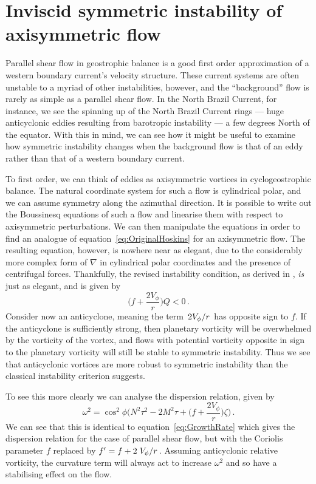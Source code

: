 \section{Inviscid symmetric instability of axisymmetric flow}
\label{sec:InviscidCentrifugal}
Parallel shear flow in geostrophic balance is a good first order approximation of a western boundary current's velocity structure. These current systems are often unstable to a myriad of other instabilities, however, and the ``background'' flow is rarely as simple as a parallel shear flow. In the North Brazil Current, for instance, we see the spinning up of the North Brazil Current rings --- huge anticyclonic eddies resulting from barotropic instability --- a few degrees North of the equator. With this in mind, we can see how it might be useful to examine how symmetric instability changes when the background flow is that of an eddy rather than that of a western boundary current.

To first order, we can think of eddies as axisymmetric vortices in cyclogeostrophic balance. The natural coordinate system for such a flow is cylindrical polar, and we can assume symmetry along the azimuthal direction. It is possible to write out the Boussinesq equations of such a flow and linearise them with respect to axisymmetric perturbations. We can then manipulate the equations in order to find an analogue of equation~\ref{eq:OriginalHoskins} for an axisymmetric flow. The resulting equation, however, is nowhere near as elegant, due to the considerably more complex form of $\nabla$ in cylindrical polar coordinates and the presence of centrifugal forces\footnotemark. Thankfully, the revised instability condition, as derived in \citet{Buckingham2021}, \textit{is} just as elegant, and is given by
\begin{equation}
    \bigg(f + \frac{2 V_\phi}{r}\bigg)Q < 0 \, .
\end{equation}
Consider now an anticyclone, meaning the term $\flatfrac{2V_\phi}{r}$ has opposite sign to $f$. If the anticyclone is sufficiently strong, then planetary vorticity will be overwhelmed by the vorticity of the vortex, and flows with potential vorticity  opposite in sign to the planetary vorticity will still be stable to symmetric instability. Thus we see that anticyclonic vortices are more robust to symmetric instability than the classical instability criterion suggests.

To see this more clearly we can analyse the dispersion relation, given by
\begin{equation}
    \label{eq:GrowthRateCurv}
    \omega^2 = \cos^2\phi \Bigg(N^2 \tau^2 - 2M^2\tau + \bigg(f + \frac{2V_\phi}{r}\bigg)\zeta\Bigg) \, .
\end{equation}
We can see that this is identical to equation~\ref{eq:GrowthRate} which gives the dispersion relation for the case of parallel shear flow, but with the Coriolis parameter $f$ replaced by $f' = f + 2 \flatfrac{V_\phi}{r}$. Assuming anticyclonic relative vorticity, the curvature term will always act to increase $\omega^2$ and so have a stabilising effect on the flow.

